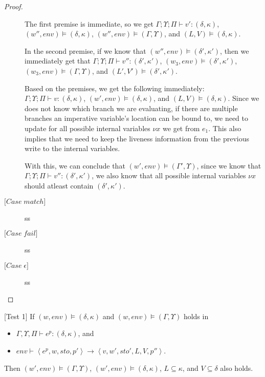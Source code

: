 \documentclass[../../master.tex]{subfiles}
\begin{document}
\begin{proof}
\begin{description}
			The first premise is immediate, so we get $\Gamma;\Upsilon;\Pi\vdash v':(\delta,\kappa)$, $(w'',env)\models(\delta,\kappa)$, $(w'',env)\models(\Gamma,\Upsilon)$, and $(L,V)\models(\delta,\kappa)$.

			In the second premise, if we know that $(w'',env)\models(\delta',\kappa')$, then we immediately get that $\Gamma;\Upsilon;\Pi\vdash v'':(\delta',\kappa')$, $(w_3,env)\models(\delta',\kappa')$, $(w_3,env)\models(\Gamma,\Upsilon)$, and $(L',V')\models(\delta',\kappa')$.

			Based on the premises, we get the following immediately: $\Gamma;\Upsilon;\Pi\vdash v:(\delta,\kappa)$, $(w',env)\models(\delta,\kappa)$, and $(L,V)\models(\delta,\kappa)$.
			Since we does not know which branch we are evaluating, if there are multiple branches an imperative variable's location can be bound to, we need to update for all possible internal variables $\nu x$ we get from $e_1$.
			This also implies that we need to keep the liveness information from the previous write to the internal variables.

			With this, we can conclude that $(w',env)\models(\Gamma',\Upsilon)$, since we know that $\Gamma;\Upsilon;\Pi\vdash v'':(\delta',\kappa')$, we also know that all possible internal variables $\nu x$ should atleast contain $(\delta',\kappa')$.

		\item[$\lbrack Case \; match \rbrack$] ss
		\item[$\lbrack Case \; fail \rbrack$] ss
		\item[$\lbrack Case \; \epsilon \rbrack$] ss
	\end{description}
\end{proof}

\iffalse
\begin{theorem}{[Test 1]}
	If $(w,env)\models(\delta,\kappa)$ and $(w,env)\models(\Gamma,\Upsilon)$ holds in
	\begin{itemize}
		\item $\Gamma,\Upsilon,\Pi\vdash e^p : (\delta,\kappa)$, and 
		\item $env\vdash\left\langle e^p,w,sto,p'\right\rangle\rightarrow\left\langle v,w',sto',L,V,p''\right\rangle$.
	\end{itemize}
	Then $(w',env)\models(\Gamma,\Upsilon)$, $(w',env)\models(\delta,\kappa)$, $L\subseteq\kappa$, and $V\subseteq\delta$ also holds.
\end{theorem}
\end{document}
